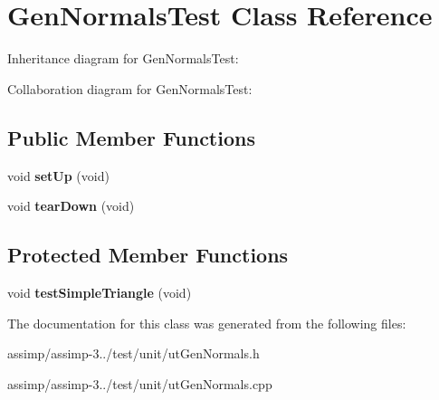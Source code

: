 \hypertarget{class_gen_normals_test}{\section{Gen\+Normals\+Test Class Reference}
\label{class_gen_normals_test}
}


Inheritance diagram for Gen\+Normals\+Test\+:


Collaboration diagram for Gen\+Normals\+Test\+:
\subsection*{Public Member Functions}
\begin{DoxyCompactItemize}
\item 
\hypertarget{class_gen_normals_test_ad3b35b2fdd197acbf91c5536b3a5621e}{void {\bfseries set\+Up} (void)}\label{class_gen_normals_test_ad3b35b2fdd197acbf91c5536b3a5621e}

\item 
\hypertarget{class_gen_normals_test_a5744393766e5f8d7e530b528a0225a9e}{void {\bfseries tear\+Down} (void)}\label{class_gen_normals_test_a5744393766e5f8d7e530b528a0225a9e}

\end{DoxyCompactItemize}
\subsection*{Protected Member Functions}
\begin{DoxyCompactItemize}
\item 
\hypertarget{class_gen_normals_test_a8ce77064b12c29d78b97d3f1b7e9d914}{void {\bfseries test\+Simple\+Triangle} (void)}\label{class_gen_normals_test_a8ce77064b12c29d78b97d3f1b7e9d914}

\end{DoxyCompactItemize}


The documentation for this class was generated from the following files\+:\begin{DoxyCompactItemize}
\item 
assimp/assimp-\/3../test/unit/ut\+Gen\+Normals.\+h\item 
assimp/assimp-\/3../test/unit/ut\+Gen\+Normals.\+cpp\end{DoxyCompactItemize}
